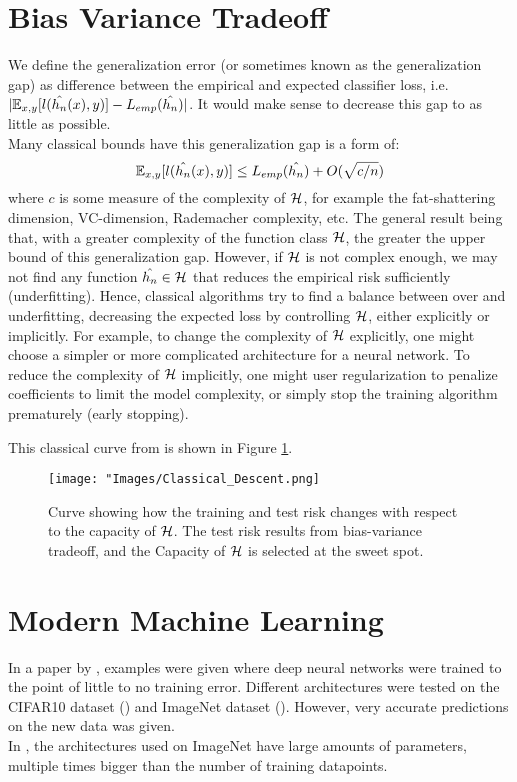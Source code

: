 \documentclass[twoside]{memoir}
\begin{document}
\section{Bias Variance Tradeoff}
We define the generalization error (or sometimes known as the generalization gap) as difference between the empirical and expected classifier loss, i.e. $ \lvert \mathbb{E}_{x,y}[l(\hat{h_n}(x), y)] - L_{emp}(\hat{h_n}) \rvert $. It would make sense to decrease this gap to as little as possible.\\
Many classical bounds have this generalization gap is a form of:
\begin{equation}
\mathbb{E}_{x,y}[l(\hat{h_n}(x), y)] \leq L_{emp}(\hat{h_n}) + O(\sqrt{c/n})
\end{equation}
where $c$ is some  measure of the complexity of $\mathcal{H}$, for example the fat-shattering dimension, VC-dimension, Rademacher complexity, etc. The general result being that, with a greater complexity of the function class $\mathcal{H}$, the greater the upper bound of this generalization gap. However, if $\mathcal{H}$ is not complex enough, we may not find any function $\hat{h_n} \in \mathcal{H}$ that reduces the empirical risk sufficiently (underfitting). Hence, classical algorithms try to find a balance between over and underfitting, decreasing the expected loss by controlling $\mathcal{H}$, either explicitly or implicitly.
For example, to change the complexity of $\mathcal{H}$ explicitly, one might choose a simpler or more complicated architecture for a neural network. To reduce the complexity of $\mathcal{H}$ implicitly, one might user regularization to  penalize coefficients to limit the model complexity, or simply stop the training algorithm prematurely (early stopping).

This classical curve from \cite{Belkin_2019} is shown in Figure \ref{fig:Classical_Descent}.
\begin{figure}
	\centering
	\texttt{[image: "Images/Classical\_Descent.png]}
	\par
	\caption{Curve showing how the training and test risk changes with respect to the capacity of $\mathcal{H}$. The test risk results from bias-variance tradeoff, and the Capacity of $\mathcal{H}$ is selected at the sweet spot.} \label{fig:Classical_Descent}
\end{figure}

\section{Modern Machine Learning}
In a paper by \cite{Zhang_Deep_Learning}, examples were given where  deep neural networks were trained to the point of little to no training error. Different architectures were tested on the CIFAR10 dataset (\cite{krizhevsky2009learning}) and ImageNet dataset (\cite{Russakovsky_2015}). However, very accurate predictions on the new data was given.\\
In \cite{Alfredo2016}, the architectures used on ImageNet have large amounts of parameters, multiple times bigger than the number of training datapoints.
\end{document}
